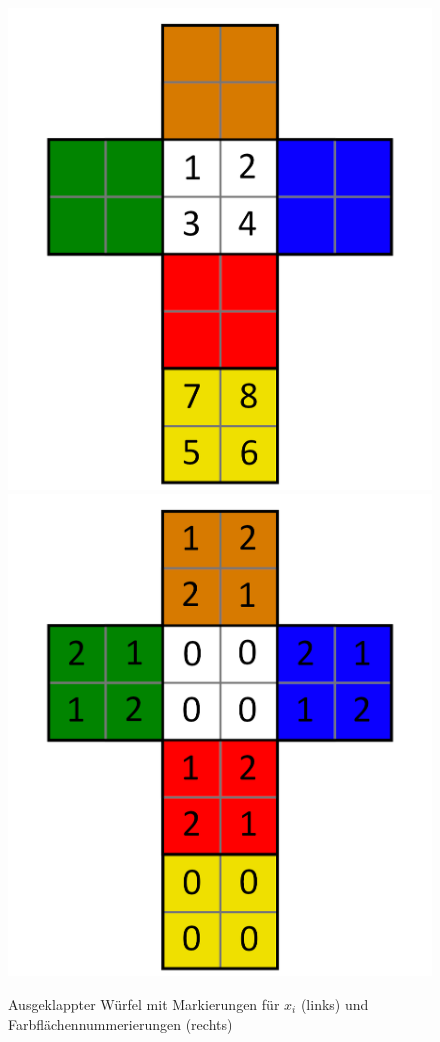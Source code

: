 \documentclass[12pt,a4paper, usenames, dvipsnames]{article}
\theoremstyle{mystyle}
\theoremstyle{definition}
\begin{document}
\begin{figure}[H]
\centering
\includegraphics[scale=0.13]{foldedout_numbers.png} \hspace*{2em}
\includegraphics[scale=0.13]{foldedout_012.png}
\caption[Markierungen $x_i$ (links), Farbflächennummern (rechts)]{Ausgeklappter Würfel mit Markierungen für $x_i$ (links) und Farbflächennummerierungen (rechts) }
\label{Abbildung_MarkierungenFuerX}
\end{figure}
\end{document}
